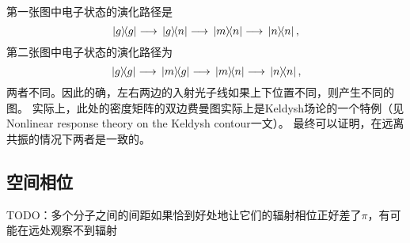 第一张图中电子状态的演化路径是
\[
    \dyad{g} \longrightarrow \dyad*{g}{n} \longrightarrow \dyad*{m}{n} \longrightarrow \dyad*{n}{n},
\]
第二张图中电子状态的演化路径为
\[
    \dyad*{g} \longrightarrow \dyad*{m}{g} \longrightarrow \dyad*{m}{n} \longrightarrow \dyad*{n}{n},
\]
两者不同。因此的确，左右两边的入射光子线如果上下位置不同，则产生不同的图。
实际上，此处的密度矩阵的双边费曼图实际上是Keldysh场论的一个特例（见Nonlinear response theory on the Keldysh contour一文）。
最终可以证明，在远离共振的情况下两者是一致的。

\subsection{空间相位}

TODO：多个分子之间的间距如果恰到好处地让它们的辐射相位正好差了$\pi$，有可能在远处观察不到辐射

